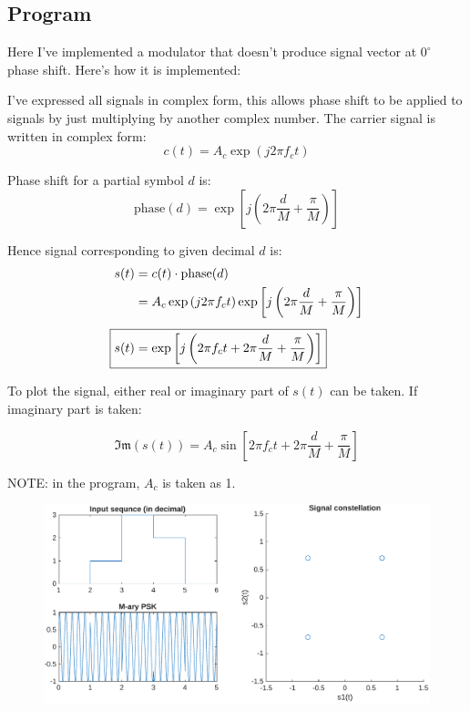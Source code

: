 \subsection*{Program}
Here I've implemented a modulator that doesn't produce signal vector at $0^\circ$ phase shift. Here's how it is implemented:

I've expressed all signals in complex form, this allows phase shift to be applied to signals by just multiplying by another complex number.
The carrier signal is written in complex form:
$$c(t) = A_c\exp\left(j2\pi f_c t\right)$$

Phase shift for a partial symbol $d$ is:
\begin{equation}
	\text{phase}(d) = \exp\left[j\left(2\pi \dfrac{d}{M} + \dfrac{\pi}{M}\right)\right]
	\label{phased}
\end{equation}

Hence signal corresponding to given decimal $d$ is:
\begin{align*}
	s(t) &= c(t) \cdot \text{phase}(d) \\
&= A_c\exp\left(j2\pi f_c t\right) \exp\left[j\left(2\pi \dfrac{d}{M} + \dfrac{\pi}{M}\right)\right] \\[5pt]
\Aboxed{s(t)&= \exp\left[j\left(2\pi f_c t + 2\pi \dfrac{d}{M} + \dfrac{\pi}{M}\right)\right]}
\end{align*}

To plot the signal, either real or imaginary part of $s(t)$ can be taken.
If imaginary part is taken:

$$\mathfrak{Im}(s(t)) = A_c\sin\left[2\pi f_c t + 2\pi \dfrac{d}{M} + \dfrac{\pi}{M}\right]$$

NOTE: in the program, $A_c$ is taken as 1.

\begin{figure}[!ht]
	\centering
	\includegraphics[width=\linewidth]{img/mpsk.pdf}
\end{figure}

